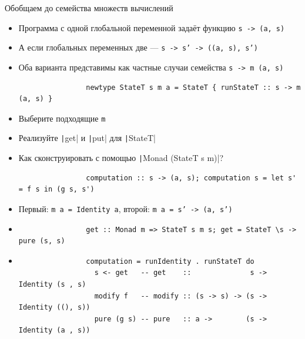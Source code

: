     \begin{frame}[fragile]{Обобщаем до семейства множеств вычислений}
        \begin{itemize}
            \item Программа с одной глобальной переменной задаёт функцию \texttt{s -> (a, s)}
            \item А если глобальных переменных две --- \texttt{s -> s' -> ((a, s), s')}
            \item Оба варианта представимы как частные случаи семейства \texttt{s -> m (a, s)}
            \begin{verbatim}
                newtype StateT s m a = StateT { runStateT :: s -> m (a, s) }
            \end{verbatim}
            \item[\todo] Выберите подходящие \texttt{m}
            \item[\todo] Реализуйте \texttt|get| и \texttt|put| для \texttt|StateT|
            \item[\todo] Как сконструировать с помощью \texttt|Monad (StateT s m)|?
            \begin{verbatim}
                computation :: s -> (a, s); computation s = let s' = f s in (g s, s')
            \end{verbatim}
            \item[\answer] \pause Первый: \texttt{m a = Identity a}, второй: \texttt{m a = s' -> (a, s')}
            \item[\answer] \pause
            \begin{verbatim}
                get :: Monad m => StateT s m s; get = StateT \s -> pure (s, s)
            \end{verbatim}
            \item[\answer] \pause
            \begin{verbatim}
                computation = runIdentity . runStateT do
                  s <- get   -- get    ::              s -> Identity (s , s)
                  modify f   -- modify :: (s -> s) -> (s -> Identity ((), s))
                  pure (g s) -- pure   :: a ->        (s -> Identity (a , s))
            \end{verbatim}
        \end{itemize}
    \end{frame}


